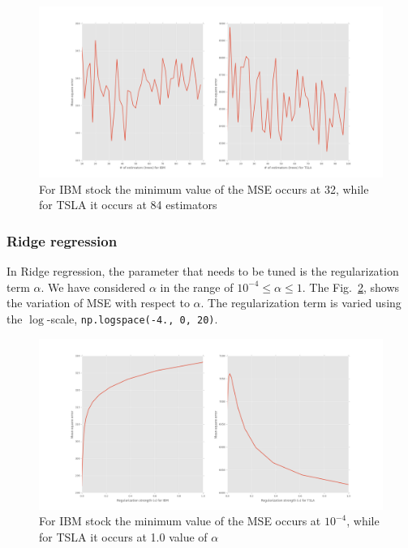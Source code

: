 \documentclass[12pt]{article}
\begin{document}
\begin{itemize}
\begin{figure}[!htbp]
\begin{center}
\includegraphics[height=0.4\textheight,width=\textwidth]{rfr_mse_estimators_IBM_TSLA.png}
\caption{For IBM stock the minimum value of the MSE occurs at 32, while for TSLA it occurs at 84 estimators}
\label{fig:rfr_hyper}
\end{center}
\end{figure}

\subsubsection{Ridge regression}
\label{sec:hyper_rr}
In Ridge regression, the parameter that needs to be tuned is the regularization term $\alpha$. We have considered $\alpha$ in the range of $10^{-4} \leq \alpha \leq 1$. The Fig.~\ref{fig:ridge_hyper}, shows the variation of MSE with respect to $\alpha$. The regularization term is varied using the $\log$-scale, \texttt{np.logspace(-4., 0, 20)}.


\begin{figure}[!htbp]
\begin{center}
\includegraphics[height=0.4\textheight,width=\textwidth]{ridge_mse_alpha_IBM_TSLA.png}
\caption{For IBM stock the minimum value of the MSE occurs at $10^{-4}$, while for TSLA it occurs at 1.0 value of $\alpha$}
\label{fig:ridge_hyper}
\end{center}
\end{figure}


\end{itemize}
\end{document}

